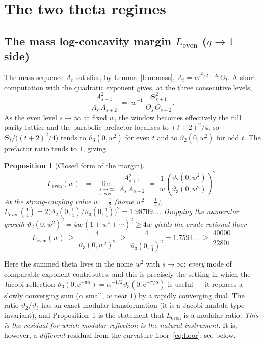 \documentclass[11pt]{article}
\newtheorem{proposition}{Proposition}
\theoremstyle{definition}
\newcommand{\e}{\mathrm{e}}
\begin{document}
\section{The two theta regimes}

\subsection{The mass log-concavity margin $L_{\mathrm{even}}$ ($q\to1$ side)}

The mass sequence $A_t$ satisfies, by Lemma~\ref{lem:mass},
$A_t=w^{t^2/2+2t}\,\Theta_t$. A short computation with the quadratic exponent
gives, at the three consecutive levels,
\[
  \frac{A_{s+1}^2}{A_s\,A_{s+2}}
  \;=\; w^{-1}\;\frac{\Theta_{s+1}^2}{\Theta_s\,\Theta_{s+2}} .
\]
As the even level $s\to\infty$ at fixed $w$, the window becomes effectively the
full parity lattice and the parabolic prefactor localises to $(t+2)^2/4$, so
$\Theta_t/\bigl((t+2)^2/4\bigr)$ tends to $\vartheta_3(0,w^2)$ for even $t$ and
to $\vartheta_2(0,w^2)$ for odd $t$. The prefactor ratio tends to $1$, giving

\begin{proposition}[Closed form of the margin]\label{prop:Leven}
\[
  L_{\mathrm{even}}(w)\;:=\;\lim_{\substack{s\to\infty\\ s\ \mathrm{even}}}
  \frac{A_{s+1}^2}{A_s\,A_{s+2}}
  \;=\; \frac{1}{w}\left(\frac{\vartheta_2(0,w^2)}{\vartheta_3(0,w^2)}\right)^{\!2}.
\]
At the strong-coupling value $w=\tfrac12$ (nome $w^2=\tfrac14$),
$L_{\mathrm{even}}(\tfrac14)=2\bigl(\vartheta_2(0,\tfrac14)/\vartheta_3(0,\tfrac14)\bigr)^2
=1.98709\ldots$. Dropping the numerator growth
$\vartheta_2(0,w^2)^2=4w\,(1+w^4+\cdots)^2\ge4w$ yields the crude rational floor
\[
  L_{\mathrm{even}}(w)\;\ge\;\frac{4}{\vartheta_3(0,w^2)^2}
  \;\ge\;\frac{4}{\vartheta_3(0,\tfrac14)^2}=1.7594\ldots\;\ge\;\frac{40000}{22801}.
\]
\end{proposition}

Here the summed theta lives in the nome $w^2$ with $s\to\infty$: \emph{every}
mode of comparable exponent contributes, and this is precisely the setting in
which the Jacobi reflection
$\vartheta_3(0,\e^{-\pi\alpha})=\alpha^{-1/2}\vartheta_3(0,\e^{-\pi/\alpha})$ is
useful --- it replaces a slowly converging sum ($\alpha$ small, $w$ near $1$) by
a rapidly converging dual. The ratio $\vartheta_2/\vartheta_3$ has an exact
modular transformation (it is a Jacobi lambda-type invariant), and
Proposition~\ref{prop:Leven} is the statement that $L_{\mathrm{even}}$ is a
modular ratio. \emph{This is the residual for which modular reflection is the
natural instrument.} It is, however, a \emph{different} residual from the
curvature floor~\eqref{eq:floor}; see below.
\end{document}
